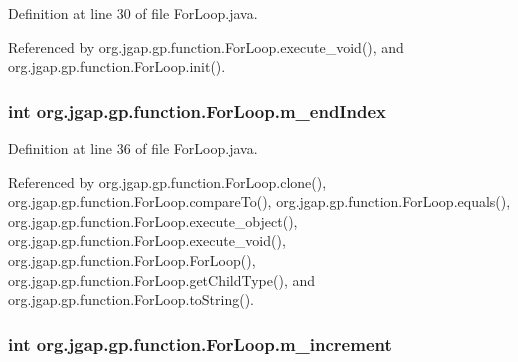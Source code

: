 Definition at line 30 of file For\-Loop.\-java.



Referenced by org.\-jgap.\-gp.\-function.\-For\-Loop.\-execute\-\_\-void(), and org.\-jgap.\-gp.\-function.\-For\-Loop.\-init().

\hypertarget{classorg_1_1jgap_1_1gp_1_1function_1_1_for_loop_a98e5b9530bafac228481070e5594e8d0}{
\subsubsection[{m\-\_\-end\-Index}]{\setlength{\rightskip}{0pt plus 5cm}int org.\-jgap.\-gp.\-function.\-For\-Loop.\-m\-\_\-end\-Index\hspace{0.3cm}{\ttfamily [private]}}}\label{classorg_1_1jgap_1_1gp_1_1function_1_1_for_loop_a98e5b9530bafac228481070e5594e8d0}


Definition at line 36 of file For\-Loop.\-java.



Referenced by org.\-jgap.\-gp.\-function.\-For\-Loop.\-clone(), org.\-jgap.\-gp.\-function.\-For\-Loop.\-compare\-To(), org.\-jgap.\-gp.\-function.\-For\-Loop.\-equals(), org.\-jgap.\-gp.\-function.\-For\-Loop.\-execute\-\_\-object(), org.\-jgap.\-gp.\-function.\-For\-Loop.\-execute\-\_\-void(), org.\-jgap.\-gp.\-function.\-For\-Loop.\-For\-Loop(), org.\-jgap.\-gp.\-function.\-For\-Loop.\-get\-Child\-Type(), and org.\-jgap.\-gp.\-function.\-For\-Loop.\-to\-String().

\hypertarget{classorg_1_1jgap_1_1gp_1_1function_1_1_for_loop_abcc098837005bbe8a7d74720aac274f4}{
\subsubsection[{m\-\_\-increment}]{\setlength{\rightskip}{0pt plus 5cm}int org.\-jgap.\-gp.\-function.\-For\-Loop.\-m\-\_\-increment\hspace{0.3cm}{\ttfamily [private]}}}\label{classorg_1_1jgap_1_1gp_1_1function_1_1_for_loop_abcc098837005bbe8a7d74720aac274f4}


